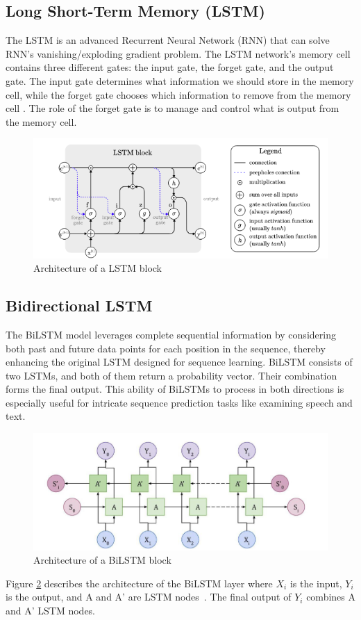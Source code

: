 \documentclass[12pt]{article}
\begin{document}
\subsection{Long Short-Term Memory (LSTM)}
The LSTM is an advanced Recurrent Neural Network (RNN) that can solve RNN's vanishing/exploding gradient problem. The LSTM network's memory cell contains three different gates: the input gate, the forget gate, and the output gate. The input gate determines what information we should store in the memory cell, while the forget gate chooses which information to remove from the memory cell \cite{van2020review}. The role of the forget gate is to manage and control what is output from the memory cell.
\begin{figure}[H]
    \centering
    \includegraphics[width=1\linewidth]{Figures/LSTM.png}
    \caption{Architecture of a LSTM block \cite{van2020review}}
    \label{fig:LSTM}
\end{figure}

\subsection{Bidirectional LSTM}
 The BiLSTM model leverages complete sequential information by considering both past and future data points for each position in the sequence, thereby enhancing the original LSTM designed for sequence learning\cite{zhang2017multi}. BiLSTM consists of two LSTMs, and both of them return a probability vector. Their combination forms the final output. This ability of BiLSTMs to process in both directions is especially useful for intricate sequence prediction tasks like examining speech and text.
 \begin{figure}[H]
    \centering
    \includegraphics[width=1\linewidth]{image.png}
    \caption{Architecture of a BiLSTM block \cite{bidirectionallstminnlp}}
    \label{fig:BiLSTM}
\end{figure}
Figure \ref{fig:BiLSTM} describes the architecture of the BiLSTM layer where $X_{i}$ is the input, $Y_{i}$ is the output, and A and A' are LSTM nodes~\cite{bidirectionallstminnlp}. The final output of $Y_{i}$ combines A and A' LSTM nodes.
\end{document}
